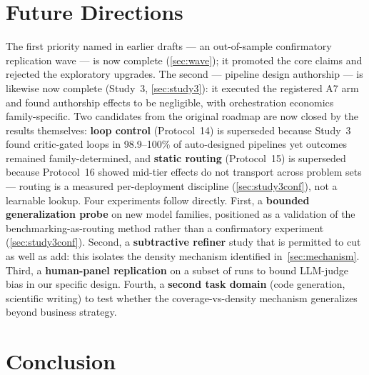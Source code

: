 \documentclass[12pt,a4paper]{article}
\begin{document}
\section{Future Directions}\label{sec:future}

The first priority named in earlier drafts --- an out-of-sample confirmatory
replication wave --- is now complete (\cref{sec:wave}); it promoted the core
claims and rejected the exploratory upgrades. The second --- pipeline design
authorship --- is likewise now complete (Study~3, \cref{sec:study3}): it
executed the registered A7 arm and found authorship effects to be negligible,
with orchestration economics family-specific. Two candidates from the original roadmap are now closed by the results
themselves: \textbf{loop control} (Protocol~14) is superseded because
Study~3 found critic-gated loops in 98.9--100\% of auto-designed
pipelines yet outcomes remained family-determined, and \textbf{static
routing} (Protocol~15) is superseded because Protocol~16 showed mid-tier
effects do not transport across problem sets --- routing is a measured
per-deployment discipline (\cref{sec:study3conf}), not a learnable
lookup. Four experiments follow directly. First, a \textbf{bounded
generalization probe} on new model families, positioned as a validation
of the benchmarking-as-routing method rather than a confirmatory
experiment (\cref{sec:study3conf}). Second, a \textbf{subtractive
refiner} study that is permitted to cut as well as add: this isolates
the density mechanism identified in~\cref{sec:mechanism}. Third, a
\textbf{human-panel replication} on a subset of runs to bound LLM-judge
bias in our specific design. Fourth, a \textbf{second task domain} (code
generation, scientific writing) to test whether the
coverage-vs-density mechanism generalizes beyond business strategy.

\section{Conclusion}\label{sec:conclusion}
\end{document}
